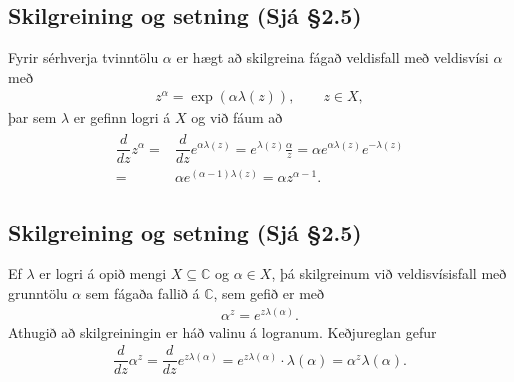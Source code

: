 \documentclass[a4paper,10pt,icelandic]{sphinxmanual}
\begin{document}
\subsection{Skilgreining og setning (Sjá \S{}2.5)}
\label{\detokenize{Kafli02:skilgreining-og-setning-sja-2-5}}
Fyrir sérhverja tvinntölu \({\alpha}\) er hægt að skilgreina fágað veldisfall með veldisvísi \(\alpha\) með
\begin{equation*}
\begin{split}z^\alpha=\exp(\alpha\lambda(z)), \qquad z\in X,\end{split}
\end{equation*}
þar sem \(\lambda\) er gefinn logri á \(X\) og við fáum að
\begin{equation*}
\begin{split}\begin{aligned}
\dfrac d{dz}z^\alpha=&\dfrac d{dz}e^{\alpha\lambda(z)}=e^{\lambda(z)}\frac
\alpha z =\alpha e^{\alpha\lambda(z)}e^{-\lambda(z)}\\
=&
\alpha e^{(\alpha-1)\lambda(z)}=\alpha z^{\alpha-1}.\end{aligned}\end{split}
\end{equation*}

\subsection{Skilgreining og setning (Sjá \S{}2.5)}
\label{\detokenize{Kafli02:id5}}
Ef \(\lambda\) er logri á opið mengi \(X\subseteq {\mathbb{C}}\) og \(\alpha \in X\), þá skilgreinum við veldisvísisfall með grunntölu \(\alpha\) sem fágaða fallið á \({\mathbb{C}}\), sem gefið er með
\begin{equation*}
\begin{split}\alpha^z=e^{z\lambda(\alpha)}.\end{split}
\end{equation*}
Athugið að skilgreiningin er háð valinu á logranum. Keðjureglan gefur
\begin{equation*}
\begin{split}\dfrac d{dz}\alpha^z=
\dfrac d{dz}e^{z\lambda(\alpha)}=e^{z\lambda(\alpha)}\cdot
\lambda(\alpha)=\alpha^z\lambda(\alpha).\end{split}
\end{equation*}
\end{document}
